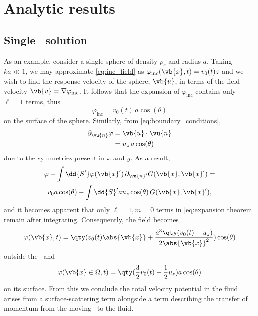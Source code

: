 \section{Analytic results}

\subsection{Single \bubble\ solution}

As an example, consider a single sphere of density $\rho_s$ and radius $a$.
Taking $k a \ll 1$, we may approximate \cref{eq:inc_field} as $\varphi_\text{inc}(\vb{x}, t) = v_0(t) z$ and we wish to find the response velocity of the sphere, $\vb{u}$, in terms of the field velocity $\vb{v} = \nabla \varphi_\text{inc}$. It follows that the expansion of $\varphi_\text{inc}$ contains only $\ell = 1$ terms, thus
\begin{equation}
  \label{eq:uniform field}
  \varphi_\text{inc} = v_0(t) \, a \cos(\theta) 
\end{equation}
on the surface of the sphere. Similarly, from \cref{eq:boundary_conditions},
\begin{align}
  \partial_{\vu{n}} \varphi &= \vb{u} \cdot \vu{n} \nonumber \\
                            &= u_z \, a \cos(\theta)
\end{align}
due to the symmetries present in $x$ and $y$.
As a result, 
\begin{equation}
  \begin{gathered}
    \varphi - \int \dd{S'} \varphi(\vb{x}') \, \partial_{\vu{n}'} G(\vb{x}, \vb{x}') = \\
    v_0 a \cos(\theta) - \int \dd{S}' a u_z \cos(\theta) \, G(\vb{x}, \vb{x}'),
  \end{gathered}
\end{equation}
and it becomes apparent that only $\ell = 1, m = 0$ terms in \cref{eq:expansion theorem} remain after integrating.
Consequently, the field becomes
\begin{equation}
  \label{eq:dipole}
  \varphi(\vb{x}, t) = \qty(v_0(t) \abs{\vb{x}} + \frac{a^3\qty(v_0(t) - u_z)}{2\abs{\vb{x}}^2})\cos(\theta)
\end{equation}
outside the \bubble\ and
\begin{equation}
  \varphi(\vb{x} \in \Omega, t) = \qty(\frac{3}{2}v_0(t) - \frac{1}{2} u_z)a \cos(\theta)
\end{equation}
on its surface.
From this we conclude the total velocity potential in the fluid arises from a surface-scattering term alongside a term describing the transfer of momentum from the moving \bubble\ to the fluid.

